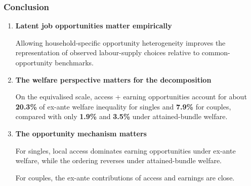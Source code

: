 \documentclass[10pt,aspectratio=169]{beamer}
\begin{document}
\begin{frame}[t]
\frametitle{Conclusion}

\vspace{0.2em}

\begin{enumerate}

\item[\textbf{1.}]
\textbf{Latent job opportunities matter empirically}

{\small
Allowing household-specific opportunity heterogeneity improves the
representation of observed labour-supply choices relative to
common-opportunity benchmarks.
}

\vspace{0.6em}

\item[\textbf{2.}]
\textbf{The welfare perspective matters for the decomposition}

{\small
On the equivalised scale, access + earning opportunities account for
about \textbf{20.3\%} of ex-ante welfare inequality for singles and
\textbf{7.9\%} for couples, compared with only
\textbf{1.9\%} and \textbf{3.5\%} under attained-bundle welfare.
}

\vspace{0.6em}

\item[\textbf{3.}]
\textbf{The opportunity mechanism matters}

{\small
For singles, local access dominates earning opportunities under
ex-ante welfare, while the ordering reverses under attained-bundle
welfare.

For couples, the ex-ante contributions of access and earnings are close.
}

\end{enumerate}

\end{frame}
\end{document}
